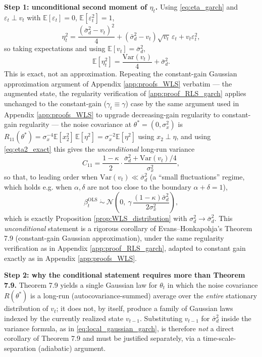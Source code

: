 \textbf{Step 1: unconditional second moment of $\eta_t$.} Using \eqref{eq:eta_garch} and
$\varepsilon_t\perp v_t$ with $\mathbb E[\varepsilon_t]=0$, $\mathbb E[\varepsilon_t^2]=1$,
\[
\eta_t^2 = \frac{(\bar\sigma_d^2-v_t)^2}{4} + (\bar\sigma_d^2-v_t)\sqrt{v_t}\,\varepsilon_t + v_t\varepsilon_t^2,
\]
so taking expectations and using $\mathbb E[v_t]=\bar\sigma_d^2$,
\begin{equation}\label{eq:eta2_exact}
\mathbb E[\eta_t^2] = \frac{\mathrm{Var}(v_t)}{4} + \bar\sigma_d^2 .
\end{equation}
This is exact, not an approximation. Repeating the constant-gain Gaussian approximation argument of
Appendix \ref{app:proofs_WLS} verbatim --- the augmented state, the regularity verification of
\ref{app:proof_RLS_garch} applies unchanged to the constant-gain ($\gamma_t\equiv\gamma$) case by the
same argument used in Appendix \ref{app:proofs_WLS} to upgrade decreasing-gain regularity to
constant-gain regularity --- the noise covariance at $\theta^*=(0,\sigma_x^2)$ is
$R_{11}(\theta^*)=\sigma_x^{-4}\mathbb E[x_2^2]\,\mathbb E[\eta^2]=\sigma_x^{-2}\mathbb E[\eta^2]$
using $x_2\perp \eta$, and using \eqref{eq:eta2_exact} this gives the \emph{unconditional} long-run
variance
\[
C_{11} = \frac{1-\kappa}{2}\cdot\frac{\bar\sigma_d^2 + \mathrm{Var}(v_t)/4}{\sigma_x^2},
\]
so that, to leading order when $\mathrm{Var}(v_t)\ll \bar\sigma_d^2$ (a ``small fluctuations'' regime,
which holds e.g. when $\alpha,\delta$ are not too close to the boundary $\alpha+\delta=1$),
\[
\beta_t^{\mathrm{OLS}} \ \dot\sim\ \mathcal N\!\left(0,\ \gamma\,\frac{(1-\kappa)\bar\sigma_d^2}{2\sigma_x^2}\right),
\]
which is exactly Proposition \ref{prop:WLS_distribution} with $\sigma_d^2\to\bar\sigma_d^2$. This
\emph{unconditional} statement is a rigorous corollary of Evans--Honkapohja's Theorem 7.9 (constant-gain
Gaussian approximation), under the same regularity verification as in Appendix
\ref{app:proof_RLS_garch}, adapted to constant gain exactly as in Appendix \ref{app:proofs_WLS}.

\textbf{Step 2: why the conditional statement requires more than Theorem 7.9.} Theorem 7.9 yields a
single Gaussian law for $\theta_t$ in which the noise covariance $R(\theta^*)$ is a long-run
(autocovariance-summed) average over the \emph{entire} stationary distribution of $v_t$; it does not,
by itself, produce a family of Gaussian laws indexed by the currently realized state $v_{t-1}$.
Substituting $v_{t-1}$ for $\bar\sigma_d^2$ inside the variance formula, as in
\eqref{eq:local_gaussian_garch}, is therefore \emph{not} a direct corollary of Theorem 7.9 and must be
justified separately, via a time-scale-separation (adiabatic) argument.

